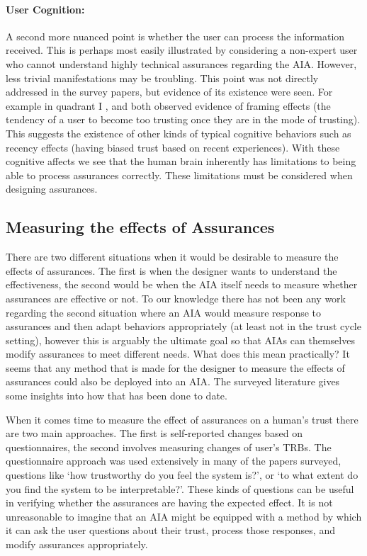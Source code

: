     \paragraph{User Cognition:} A second more nuanced point is whether the user can process the information received. This is perhaps most easily illustrated by considering a non-expert user who cannot understand highly technical assurances regarding the AIA. However, less trivial manifestations may be troubling. This point was not directly addressed in the survey papers, but evidence of its existence were seen. For example in quadrant I \cite{Riley1996-qm}, and \cite{Freedy2007-sg} both observed evidence of framing effects (the tendency of a user to become too trusting once they are in the mode of trusting). This suggests the existence of other kinds of typical cognitive behaviors such as recency effects (having biased trust based on recent experiences). With these cognitive affects we see that the human brain inherently has limitations to being able to process assurances correctly. These limitations must be considered when designing assurances.



\subsection{Measuring the effects of Assurances}

    There are two different situations when it would be desirable to measure the effects of assurances. The first is when the designer wants to understand the effectiveness, the second would be when the AIA itself needs to measure whether assurances are effective or not. To our knowledge there has not been any work regarding the second situation where an AIA would measure response to assurances and then adapt behaviors appropriately (at least not in the trust cycle setting), however this is arguably the ultimate goal so that AIAs can themselves modify assurances to meet different needs. What does this mean practically? It seems that any method that is made for the designer to measure the effects of assurances could also be deployed into an AIA. The surveyed literature gives some insights into how that has been done to date.
   
    When it comes time to measure the effect of assurances on a human's trust there are two main approaches. The first is self-reported changes based on questionnaires, the second involves measuring changes of user's TRBs. The questionnaire approach was used extensively in many of the papers surveyed, questions like `how trustworthy do you feel the system is?', or `to what extent do you find the system to be interpretable?'. These kinds of questions can be useful in verifying whether the assurances are having the expected effect. It is not unreasonable to imagine that an AIA might be equipped with a method by which it can ask the user questions about their trust, process those responses, and modify assurances appropriately.
    
